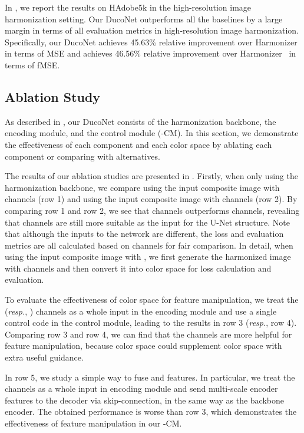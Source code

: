 \documentclass[sigconf]{acmart}
\begin{document}
In , we report the results on HAdobe5k in the high-resolution image harmonization setting.
Our DucoNet outperforms all the baselines by a large margin in terms of all evaluation metrics in high-resolution image harmonization.
Specifically, our DucoNet achieves 45.63\% relative improvement over Harmonizer~\cite{harmonizer} in terms of MSE and achieves 46.56\% relative improvement over Harmonizer~\cite{harmonizer} in terms of fMSE. 


\subsection{Ablation Study}\label{section:Ablation Study}

As described in , our DucoNet consists of the harmonization backbone, the  encoding module, and the  control module (-CM). 
In this section, we demonstrate the effectiveness of each component and each color space by ablating each component or comparing with alternatives.

The results of our ablation studies are presented in . Firstly, when only using the harmonization backbone, we compare using the input composite image with  channels (row 1) and using the input composite image with  channels (row 2).
By comparing row 1 and row 2,  we see that  channels outperforms  channels, revealing that  channels are still more suitable as the input for the U-Net structure. 
Note that although the inputs to the network are different, the loss and evaluation metrics are all calculated based on  channels for fair comparison.
In detail, when using the input composite image with , we first generate the harmonized image with  channels and then convert it into  color space for loss calculation and evaluation.

To evaluate the effectiveness of  color space for feature manipulation, we treat the  (\emph{resp.}, ) channels as a whole input in the encoding module and use a single control code in the control module, leading to the results in row 3 (\emph{resp.}, row 4). 
Comparing row 3 and row 4, we can find that the  channels are more helpful for feature manipulation, because  color space could supplement  color space with extra useful guidance.

In row 5, we study a simple way to fuse  and  features. In particular, we treat the  channels as a whole input in encoding module and send multi-scale encoder features to the decoder via skip-connection, in the same way as the backbone encoder. The obtained performance is worse than row 3,  which demonstrates the effectiveness of feature manipulation in our -CM.
\end{document}
